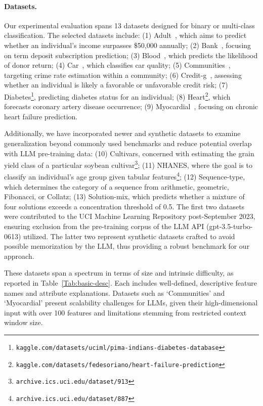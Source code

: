 \paragraph{Datasets.}
Our experimental evaluation spans 13 datasets designed for binary or multi-class classification. The selected datasets include: (1) Adult~\cite{asuncion2007uci}, which aims to predict whether an individual’s income surpasses \$50,000 annually; (2) Bank~\cite{moro2014data}, focusing on term deposit subscription prediction; (3) Blood~\cite{yeh2009knowledge}, which predicts the likelihood of donor return; (4) Car~\cite{kadra2021well}, which classifies car quality; (5) Communities~\cite{misc_communities_and_crime_183}, targeting crime rate estimation within a community; (6) Credit-g~\cite{kadra2021well}, assessing whether an individual is likely a favorable or unfavorable credit risk; (7) Diabetes\footnote{\texttt{kaggle.com/datasets/uciml/pima-indians-diabetes-database}}, predicting diabetes status for an individual; (8) Heart\footnote{\texttt{kaggle.com/datasets/fedesoriano/heart-failure-prediction}}, which forecasts coronary artery disease occurrence; (9) Myocardial~\cite{misc_myocardial_infarction_complications_579}, focusing on chronic heart failure prediction.

Additionally, we have incorporated newer and synthetic datasets to examine generalization beyond commonly used benchmarks and reduce potential overlap with LLM pre-training data: (10) Cultivars, concerned with estimating the grain yield class of a particular soybean cultivar\footnote{\texttt{archive.ics.uci.edu/dataset/913}}; (11) NHANES, where the goal is to classify an individual's age group given tabular features\footnote{\texttt{archive.ics.uci.edu/dataset/887}}; (12) Sequence-type, which determines the category of a sequence from arithmetic, geometric, Fibonacci, or Collatz; (13) Solution-mix, which predicts whether a mixture of four solutions exceeds a concentration threshold of 0.5. The first two datasets were contributed to the UCI Machine Learning Repository post-September 2023, ensuring exclusion from the pre-training corpus of the LLM API (gpt-3.5-turbo-0613) utilized. The latter two represent synthetic datasets crafted to avoid possible memorization by the LLM, thus providing a robust benchmark for our approach.

These datasets span a spectrum in terms of size and intrinsic difficulty, as reported in Table~\ref{Tab:basic-desc}. Each includes well-defined, descriptive feature names and attribute explanations. Datasets such as ‘Communities’ and ‘Myocardial’ present scalability challenges for LLMs, given their high-dimensional input with over 100 features and limitations stemming from restricted context window size.

